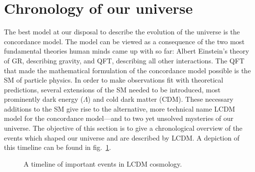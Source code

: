 \section{Chronology of our universe} \label{sec:chronology}
The best model at our disposal to describe the evolution of the universe is the concordance model. The model can be viewed as a consequence of the two most fundamental theories human minds came up with so far: Albert Einstein's theory of \ac{GR}, describing gravity, and \ac{QFT}, describing all other interactions. The \ac{QFT} that made the mathematical formulation of the concordance model possible is the \acf{SM} of particle physics. In order to make observations fit with theoretical predictions,  several extensions of the \ac{SM} needed to be introduced, most prominently dark energy ($\Lambda$) and cold dark matter (CDM). These necessary additions to the \ac{SM} give rise to the alternative, more technical name \ac{LCDM} model for the concordance model---and to two yet unsolved mysteries of our universe. The objective of this section is to give a chronological overview of the events which shaped our universe and are described by \ac{LCDM}. A depiction of this timeline can be found in fig.~\ref{fig:timeline}.

\begin{figure}[h]
	\centering
	\caption{A timeline of important events in \ac{LCDM} cosmology.}
	\label{fig:timeline}
\end{figure}		

